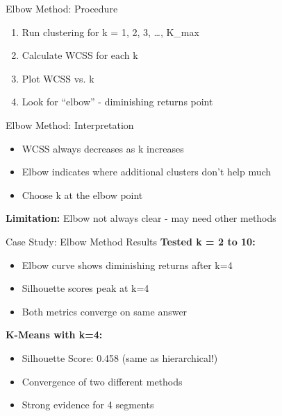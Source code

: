 \documentclass[aspectratio=169,ignorenonframetext]{beamer}
\begin{document}
\begin{frame}{Elbow Method: Procedure}
\begin{enumerate}
\item
  Run clustering for k = 1, 2, 3, \ldots, K\_max
\item
  Calculate WCSS for each k
\item
  Plot WCSS vs. k
\item
  Look for ``elbow'' - diminishing returns point
\end{enumerate}
\end{frame}

\begin{frame}{Elbow Method: Interpretation}
\begin{itemize}
\item
  WCSS always decreases as k increases
\item
  Elbow indicates where additional clusters don't help much
\item
  Choose k at the elbow point
\end{itemize}

\textbf{Limitation:} Elbow not always clear - may need other methods
\end{frame}

\begin{frame}{Case Study: Elbow Method Results}
\textbf{Tested k = 2 to 10:}

\begin{itemize}
\item
  Elbow curve shows diminishing returns after k=4
\item
  Silhouette scores peak at k=4
\item
  Both metrics converge on same answer
\end{itemize}

\textbf{K-Means with k=4:}

\begin{itemize}
\item
  Silhouette Score: 0.458 (same as hierarchical!)
\item
  Convergence of two different methods
\item
  Strong evidence for 4 segments
\end{itemize}
\end{frame}
\end{document}
